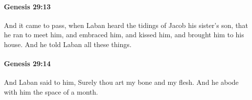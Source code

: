 		\paragraph{Genesis 29:13} %
			\label{GENESIS-29-13}

			And it came to pass, when Laban heard the tidings of Jacob his sister's son, that he ran to meet him, and embraced him, and kissed him, and brought him to his house. And he told Laban all these things.


		\paragraph{Genesis 29:14} %
			\label{GENESIS-29-14}

			And Laban said to him, Surely thou art my bone and my flesh. And he abode with him the space of a month.


